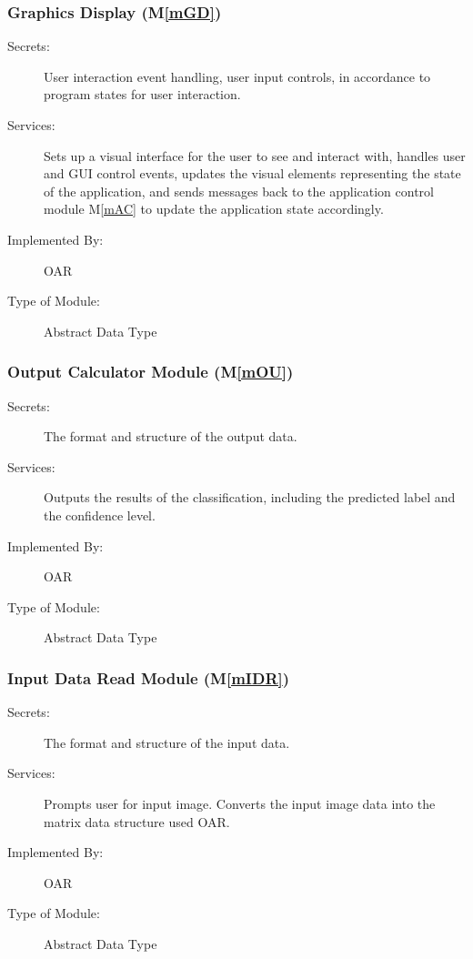 \documentclass[12pt, titlepage]{article}
\newcommand{\mref}[1]{M\ref{#1}}
\begin{document}
\subsubsection{Graphics Display (\mref{mGD})}

\begin{description}
\item[Secrets:] User interaction event handling, user input controls, in accordance to program states for user interaction.
\item[Services:] Sets up a visual interface for the user to see and interact with, handles user and GUI control events, updates the 
visual elements representing the state of the application, and sends messages back to the application control module \mref{mAC} to update
the application state accordingly.
\item[Implemented By:] OAR
\item[Type of Module:] Abstract Data Type
\end{description}

\subsubsection{Output Calculator Module (\mref{mOU})}

\begin{description}
\item[Secrets:] The format and structure of the output data.
\item[Services:] Outputs the results of the classification, including the predicted label and the confidence level.
\item[Implemented By:] OAR
\item[Type of Module:] Abstract Data Type
\end{description}

\subsubsection{Input Data Read Module (\mref{mIDR})}

\begin{description}
\item[Secrets:] The format and structure of the input data.
\item[Services:] Prompts user for input image. Converts the input image data into the matrix data structure used OAR.
\item[Implemented By:] OAR
\item[Type of Module:] Abstract Data Type
\end{description}
\end{document}
